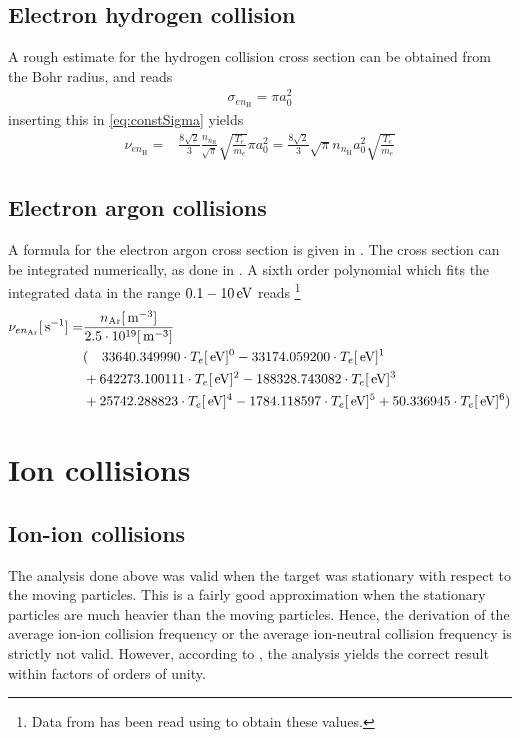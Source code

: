 \subsection{Electron hydrogen collision}
A rough estimate for the hydrogen collision cross section can be obtained from the Bohr radius, and reads
%
\begin{align*}
    \sigma_{en_\text{H}} = \pi a_0^2
\end{align*}
%
inserting this in \cref{eq:constSigma} yields
%
\begin{align*}
    \nu_{en_\text{H}}
    =&
    \frac{8\sqrt{2}}{3}
    \frac{n_{n_\text{H}} }{\sqrt{\pi}}
    \sqrt{ \frac{T_e}{m_e}}
    \pi a_0^2
    =
    \frac{8\sqrt{2}}{3}
    \sqrt{\pi} n_{n_\text{H}}  a_0^2
    \sqrt{ \frac{T_e}{m_e}}
\end{align*}
%

\subsection{Electron argon collisions}
%
A formula for the electron argon cross section is given in \cite{Hayashi1981}.
The cross section can be integrated numerically, as done in \cite{Schroder2003Phd}.
A sixth order polynomial which fits the integrated data in the range $0.1 - 10 \, \text{eV}$ reads%
%
\footnote{Data from \cite{Schroder2003Phd} has been read using \cite{Ankit2016Web} to obtain these values.}
%
\begin{align}
    \nu_{en_\text{Ar}}[\, \text{s}^{-1}]
    =&
    \frac{n_{\text{Ar}}[\, \text{m}^{-3}]}{2.5\cdot10^{19}[\, \text{m}^{-3}]}
    \\
    &
    (
    \quad 33640.349990\cdot T_e[\, \text{eV}]^0 -33174.059200\cdot T_e[\, \text{eV}]^1\\
&+642273.100111\cdot T_e[\, \text{eV}]^2 -188328.743082\cdot T_e[\, \text{eV}]^3\\
&+25742.288823\cdot T_e[\, \text{eV}]^4 -1784.118597\cdot T_e[\, \text{eV}]^5 +50.336945\cdot T_e[\, \text{eV}]^6)
\label{eq:elArColl}
\end{align}

\section{Ion collisions}
\label{sec:nui}
%
\subsection{Ion-ion collisions}
The analysis done above was valid when the target was stationary with respect to the moving particles.
This is a fairly good approximation when the stationary particles are much heavier than the moving particles.
Hence, the derivation of the average ion-ion collision frequency or the average ion-neutral collision frequency is strictly not valid.
However, according to \cite{Goldston1995book}, the analysis yields the correct result within factors of orders of unity.

